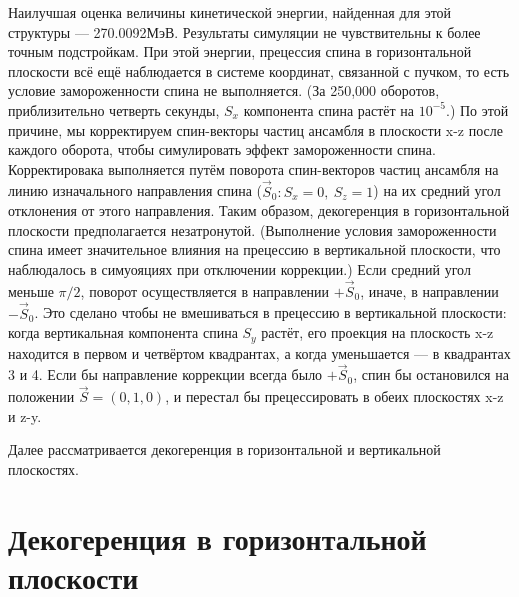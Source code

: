 \documentclass{article}
\newcommand{\Kmagic}{270.0092} %
\begin{document}
Наилучшая оценка величины кинетической энергии, найденная для этой структуры --- \Kmagic МэВ. Результаты симуляции не чувствительны к более точным подстройкам. При этой энергии, прецессия спина в горизонтальной плоскости всё ещё наблюдается в системе координат, связанной с пучком, то есть условие замороженности спина не выполняется. (За 250,000 оборотов, приблизительно четверть секунды, $S_x$ компонента спина растёт на $10^{-5}$.) По этой причине, мы корректируем спин-векторы частиц ансамбля в плоскости x-z после каждого оборота, чтобы симулировать эффект замороженности спина. Корректировака выполняется путём поворота спин-векторов частиц ансамбля на линию изначального направления спина ($\vec S_0: S_x = 0,~ S_z = 1$) на их средний угол отклонения от этого направления. Таким образом, декогеренция в горизонтальной плоскости предполагается незатронутой. (Выполнение условия замороженности спина имеет значительное влияния на прецессию в вертикальной плоскости, что наблюдалось в симуояциях при отключении коррекции.) Если средний угол меньше $\pi/2$, поворот осуществляется в направлении $+\vec S_0$, иначе, в направлении $-\vec S_0$. Это сделано чтобы не вмешиваться в прецессию в вертикальной плоскости: когда вертикальная компонента спина $S_y$ растёт, его проекция на плоскость x-z находится в первом и четвёртом квадрантах, а когда уменьшается --- в квадрантах 3 и 4. Если бы направление коррекции всегда было $+\vec S_0$, спин бы остановился на положении $\vec S = (0, 1, 0)$, и перестал бы прецессировать в обеих плоскостях x-z и z-y.

Далее рассматривается декогеренция в горизонтальной и вертикальной плоскостях.

\section{Декогеренция в горизонтальной плоскости}
\end{document}
